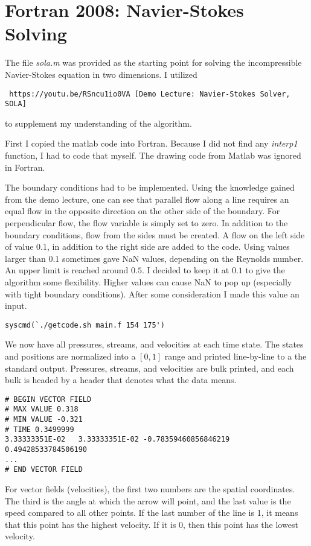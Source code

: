 \documentclass[listof=totoc]{report}
\begin{document}
\section{Fortran 2008: Navier-Stokes Solving}
The file \emph{sola.m} was provided as the starting point for solving the incompressible Navier-Stokes equation in two dimensions.
I utilized \begin{verbatim} https://youtu.be/RSncu1io0VA [Demo Lecture: Navier-Stokes Solver, SOLA] \end{verbatim} to supplement my understanding of the algorithm.

First I copied the matlab code into Fortran. Because I did not find any \emph{interp1} function, I had to code that myself. The drawing code from Matlab was ignored in Fortran.

The boundary conditions had to be implemented. Using the knowledge gained from the demo lecture, one can see that parallel flow along a line requires an equal flow in the opposite direction on the other side of the boundary. For perpendicular flow, the flow variable is simply set to zero. In addition to the boundary conditions, flow from the sides must be created. A flow on the left side of value $0.1$, in addition to the right side are added to the code.
Using values larger than $0.1$ sometimes gave NaN values, depending on the Reynolds number. An upper limit is reached around $0.5$. I decided to keep it at $0.1$ to give the algorithm some flexibility. Higher values can cause NaN to pop up (especially with tight boundary conditions). After some consideration I made this value an input.

\begin{verbatim}
syscmd(`./getcode.sh main.f 154 175')
\end{verbatim}

We now have all pressures, streams, and velocities at each time state. The states and positions are normalized into a $[0, 1]$ range and printed line-by-line to a the standard output. Pressures, streams, and velocities are bulk printed, and each bulk is headed by a header that denotes what the data means.

\begin{verbatim}
# BEGIN VECTOR FIELD
# MAX VALUE 0.318
# MIN VALUE -0.321
# TIME 0.3499999
3.33333351E-02   3.33333351E-02 -0.78359460856846219       0.49428533784506190
...
# END VECTOR FIELD
\end{verbatim}

For vector fields (velocities), the first two numbers are the spatial coordinates. The third is the angle at which the arrow will point, and the last value is the speed compared to all other points. If the last number of the line is 1, it means that this point has the highest velocity. If it is 0, then this point has the lowest velocity.
\end{document}
